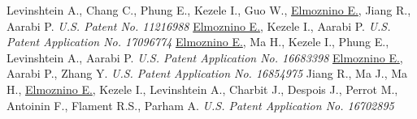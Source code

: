 \documentclass[letterpaper]{twentysecondcv} %
\begin{document}
\begin{pub}
	              {Levinshtein A., Chang C., Phung E., Kezele I., Guo W., \underline{Elmoznino E.}, Jiang R., Aarabi P. \textit{U.S. Patent No. 11216988}}
	              {\underline{Elmoznino E.}, Kezele I., Aarabi P. \textit{U.S. Patent Application No. 17096774}}
	              {\underline{Elmoznino E.}, Ma H., Kezele I., Phung E., Levinshtein A., Aarabi P. \textit{U.S. Patent Application No. 16683398}}
	              {\underline{Elmoznino E.}, Aarabi P., Zhang Y. \textit{U.S. Patent Application No. 16854975}}
	              {Jiang R., Ma J., Ma H., \underline{Elmoznino E.}, Kezele I., Levinshtein A., Charbit J., Despois J., Perrot M., Antoinin F., Flament R.S., Parham A. \textit{U.S. Patent Application No. 16702895}}
\end{pub}

\end{document}
